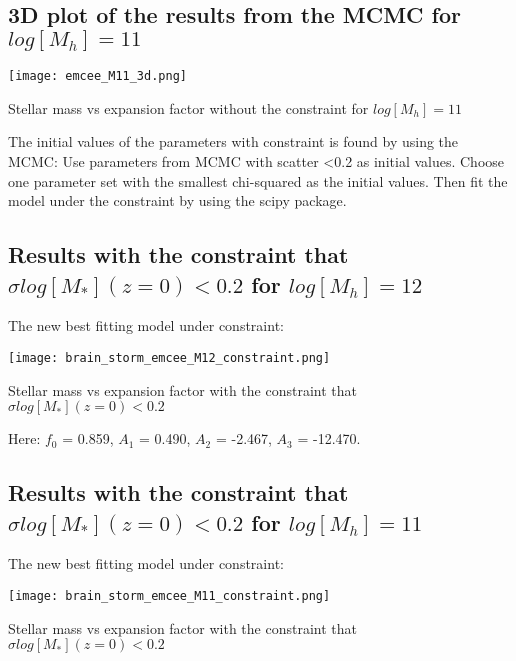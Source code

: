 \documentclass[ajp]{article}   	%
\begin{document}
\subsection{3D plot of the results from the MCMC for $log[M_h]=11$}

\begin{center}
\texttt{[image: emcee\_M11\_3d.png]}

\centerline{Stellar mass vs expansion factor without the constraint for $log[M_h]=11$}
\end{center}





The initial values of the parameters with constraint is found by using the MCMC: Use parameters from MCMC with scatter <0.2 as initial values. Choose one parameter set with the smallest chi-squared as the initial values. Then fit the model under the constraint by using the scipy package.

\subsection{Results with the constraint that $\sigma log[M_*](z=0) <0.2$ for $log[M_h]=12$}
The new best fitting model under constraint:

\begin{center}
\texttt{[image: brain\_storm\_emcee\_M12\_constraint.png]}

\centerline{Stellar mass vs expansion factor with the constraint that $\sigma log[M_*](z=0) <0.2$}

\end{center}

Here: $f_0$ = 0.859, $A_1$ = 0.490, $A_2$ = -2.467, $A_3$ = -12.470.



\subsection{Results with the constraint that $\sigma log[M_*](z=0) <0.2$ for $log[M_h]=11$}
The new best fitting model under constraint:

\begin{center}
\texttt{[image: brain\_storm\_emcee\_M11\_constraint.png]}

\centerline{Stellar mass vs expansion factor with the constraint that $\sigma log[M_*](z=0) <0.2$}

\end{center}
\end{document}
